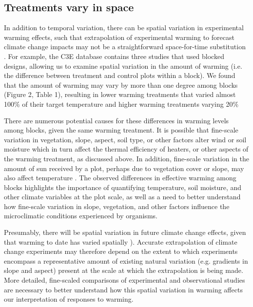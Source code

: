 \documentclass{article}
\begin{document}
\subsection* {Treatments vary in space}
In addition to temporal variation, there can be spatial variation in experimental warming effects, such that extrapolation of experimental warming to forecast climate change impacts may not be a straightforward space-for-time substitution \citep{johnson2008,jochner2013}. For example, the C3E database contains three studies that used blocked designs, allowing us to examine spatial variation in the amount of warming (i.e. the difference between treatment and control plots within a block). We found that the amount of warming may vary by more than one degree among blocks (Figure 2, Table 1), resulting in lower warming treatments that varied almost 100\% of their target temperature and higher warming treatments varying 20\% %
\par There are numerous potential causes for these differences in warming levels among blocks, given the same warming treatment. It is possible that fine-scale variation in vegetation, slope, aspect, soil type, or other factors alter wind or soil moisture which in turn affect the thermal efficiency of heaters, or other aspects of the warming treatment, as discussed above\citep{peterjohn1993,kimball2005,kimball2008,hoeppner2012}.  In addition, fine-scale variation in the amount of sun received by a plot, perhaps due to vegetation cover or slope, may also affect temperature \citep{rollinson2015}. The observed differences in effective warming among blocks highlights the importance of quantifying temperature, soil moisture, and other climate variables at the plot scale, as well as a need to better understand how fine-scale variation in slope, vegetation, and other factors influence the microclimatic conditions experienced by organisms.  
\par Presumably, there will be spatial variation in future climate change effects, given that warming to date has varied spatially \citep{ipcc2013}).  Accurate extrapolation of climate change experiments may therefore depend on the extent to which experiments encompass a representative amount of existing natural variation (e.g. gradients in slope and aspect) present at the scale at which the extrapolation is being made. More detailed, fine-scaled comparisons of experimental and observational studies are necessary to better understand how this spatial variation in warming affects our interpretation of responses to warming. 
\end{document}
